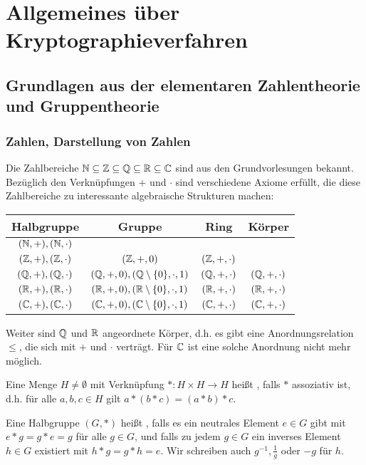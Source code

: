 \section{Allgemeines über Kryptographieverfahren}
\label{sec:para1}

\subsection{Grundlagen aus der elementaren Zahlentheorie und Gruppentheorie}
\subsubsection{Zahlen, Darstellung von Zahlen}
	Die Zahlbereiche $\mathbb{N} \subseteq \mathbb{Z} \subseteq \mathbb{Q} \subseteq \mathbb{R} \subseteq \mathbb{C}$ sind aus den Grundvorlesungen bekannt. Bezüglich den Verknüpfungen $+$ und $\cdot$ sind verschiedene Axiome erfüllt, die diese Zahlbereiche zu interessante algebraische Strukturen machen:	
\begin{center}
	\begin{tabular}{|c|c|c|c|}
	\hline  \textbf{Halbgruppe}		&	\textbf{Gruppe}								&	\textbf{Ring}			&	\textbf{Körper} \\
	\hline	$(\mathbb{N},+), (\mathbb{N},\cdot)$ & & & \\
	\hline $(\mathbb{Z},+),(\mathbb{Z},\cdot)$ & $(\mathbb{Z},+,0) $ & $(\mathbb{Z},+,\cdot)$ & \\
	\hline $(\mathbb{Q},+),(\mathbb{Q},\cdot)$ & $(\mathbb{Q},+,0),(\mathbb{Q} \setminus \{0\}, \cdot, 1)$ & $(\mathbb{Q},+,\cdot)$ & $(\mathbb{Q},+,\cdot)$ \\
	\hline $(\mathbb{R},+), (\mathbb{R},\cdot)$ & $(\mathbb{R},+,0), (\mathbb{R}\setminus \{0\}, \cdot, 1)$ & $(\mathbb{R},+,\cdot)$ & $(\mathbb{R},+,\cdot)$ \\
	\hline $(\mathbb{C},+),(\mathbb{C},\cdot)$ & $(\mathbb{C},+,0),(\mathbb{C} \setminus \{0\}, \cdot, 1)$ & $(\mathbb{C},+,\cdot)$ & $(\mathbb{C},+,\cdot)$ \\
	\hline
	\end{tabular} 
\end{center}
	Weiter sind $\mathbb{Q}$ und $\mathbb{R}$ angeordnete Körper, d.h. es gibt eine Anordnungsrelation $\leq$, die sich mit $+$ und $\cdot$ verträgt. Für $\mathbb{C}$ ist eine solche Anordnung nicht mehr möglich.
	
\begin{defn}[Halbgruppe]
	Eine Menge $H \neq \emptyset$ mit Verknüpfung $*\colon H \times H \rightarrow H$ heißt , falls $*$ assoziativ ist, d.h. für alle $a,b,c \in H$ gilt $a*(b*c) = (a*b)*c$.
\end{defn}

\begin{defn}[Gruppe]
	Eine Halbgruppe $(G,*)$ heißt , falls es ein neutrales Element $e \in G$ gibt mit $e*g = g*e = g$ für alle $g \in G$, und falls zu jedem $g \in G$ ein inverses Element $h \in G$ existiert mit $h * g = g * h = e$. Wir schreiben auch $g^{-1}, \frac{1}{g}$ oder $-g$ für $h$.
\end{defn}

